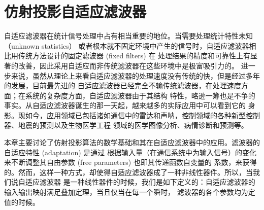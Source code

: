  \chapter{仿射投影自适应滤波器}
自适应滤波器在统计信号处理中占有相当重要的地位。当需要处理统计特性未知 （unknown statistics）
或者根本就不固定环境中产生的信号时，自适应滤波器相比用传统方法设计的固定滤波器 (fixed filters) 在
处理结果的精度和可靠性上有显著的改善，因此采用自适应而非传统滤波器在这些环境中是极富吸引力的。
进一步来说，虽然从理论上来看自适应滤波器的处理速度没有传统的快，但是经过多年的发展，目前最先进的
自适应滤波器已经完全不输传统滤波器，在处理速度方面；在系统的复杂度方面，自适应滤波器由于其结构
特性，略逊一筹也是不争的事实。从自适应滤波器诞生的那一天起，越来越多的实际应用中可以看到它的
身影。现如今，应用领域已包括诸如通信中的雷达和声呐，控制领域的各种新型控制器、地震的预测以及生物医学工程
领域的医学图像分析、病情诊断和预测等。
\par
本章主要讨论了仿射投影算法的数学基础和其在自适应滤波器中的应用。滤波器的自适应特性 (adaptation) 是通过
根据输入量（在通信系统中为输入信号）的变化来不断调整其自由参数 (free parameters) 也即其传递函数自变量的
系数，来获得的。然而，这样一种方式，却使得自适应滤波器成了一种非线性器件。所以，当我们说自适应滤波器
是一种线性器件的时候，我们是如下定义的：自适应滤波器的输入输出映射满足叠加定理，当且仅当在每一个瞬时，
滤波器的各个参数均为定值的时候。
\par

